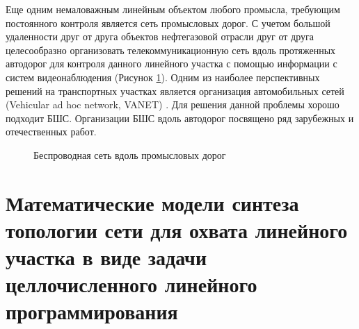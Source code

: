 Еще одним немаловажным линейным объектом любого промысла, требующим постоянного контроля является сеть промысловых дорог. С учетом большой удаленности друг от друга объектов нефтегазовой отрасли друг от друга целесообразно организовать телекоммуникационную сеть вдоль протяженных автодорог для контроля данного линейного участка с помощью информации с систем видеонаблюдения \cite{Vish2015} (Рисунок \ref{fig:part2_roadisdeunit}). Одним из наиболее перспективных решений на транспортных участках является организация автомобильных сетей (Vehicular ad hoc network, VANET) \cite{Massobrio2020, Campolo2015}. Для решения данной проблемы хорошо подходит БШС. Организации БШС вдоль автодорог посвящено ряд зарубежных и отечественных работ. 

\begin{figure}[ht]
  \caption{Беспроводная сеть вдоль промысловых дорог}\label{fig:part2_roadisdeunit}
\end{figure}





\section{Математические модели синтеза топологии сети для охвата линейного участка в виде задачи целлочисленного линейного программирования}



